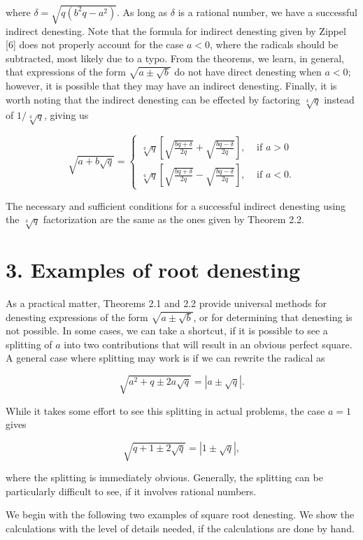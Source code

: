 \documentclass[11pt,letterpaper]{article}
\begin{document}
where $\delta=\sqrt{q\left(b^{2} q-a^{2}\right)}$. As long as $\delta$ is a rational number, we have a successful indirect denesting. Note that the formula for indirect denesting given by Zippel [6] does not properly account for the case $a<0$, where the radicals should be subtracted, most likely due to a typo. From the theorems, we learn, in general, that expressions of the form $\sqrt{a \pm \sqrt{b}}$ do not have direct denesting when $a<0$; however, it is possible that they may have an indirect denesting. Finally, it is worth noting that the indirect denesting can be effected by factoring $\sqrt[4]{q}$ instead of $1 / \sqrt[4]{q}$, giving us

\[
\sqrt{a+b \sqrt{q}}= \begin{cases}\sqrt[4]{q}\left[\sqrt{\frac{b q+\delta}{2 q}}+\sqrt{\frac{b q-\delta}{2 q}}\right], & \text { if } a>0 \\ \sqrt[4]{q}\left[\sqrt{\frac{b q+\delta}{2 q}}-\sqrt{\frac{b q-\delta}{2 q}}\right], & \text { if } a<0 .\end{cases}
\]

The necessary and sufficient conditions for a successful indirect denesting using the $\sqrt[4]{q}$ factorization are the same as the ones given by Theorem 2.2.

\section*{3. Examples of root denesting}
As a practical matter, Theorems 2.1 and 2.2 provide universal methods for denesting expressions of the form $\sqrt{a \pm \sqrt{b}}$, or for determining that denesting is not possible. In some cases, we can take a shortcut, if it is possible to see a splitting of $a$ into two contributions that will result in an obvious perfect square. A general case where splitting may work is if we can rewrite the radical as

\[
\sqrt{a^{2}+q \pm 2 a \sqrt{q}}=|a \pm \sqrt{q}| .
\]

While it takes some effort to see this splitting in actual problems, the case $a=1$ gives

\[
\sqrt{q+1 \pm 2 \sqrt{q}}=|1 \pm \sqrt{q}|,
\]

where the splitting is immediately obvious. Generally, the splitting can be particularly difficult to see, if it involves rational numbers.

We begin with the following two examples of square root denesting. We show the calculations with the level of details needed, if the calculations are done by hand.
\end{document}
